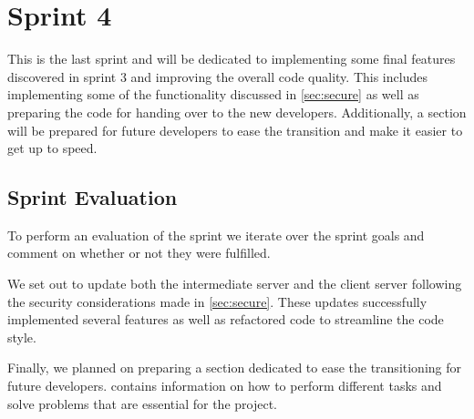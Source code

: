 \chapter{Sprint 4}
This is the last sprint and will be dedicated to implementing some final features discovered in sprint 3 and improving the overall code quality. This includes implementing some of the functionality discussed in \cref{sec:secure} as well as preparing the code for handing over to the new developers. Additionally, a section will be prepared for future developers to ease the transition and make it easier to get up to speed.






\section{Sprint Evaluation}
To perform an evaluation of the sprint we iterate over the sprint goals and comment on whether or not they were fulfilled.

We set out to update both the intermediate server and the client server following the security considerations made in \cref{sec:secure}. These updates successfully implemented several features as well as refactored code to streamline the code style.

Finally, we planned on preparing a section dedicated to ease the transitioning for future developers.  contains information on how to perform different tasks and solve problems that are essential for the project.
